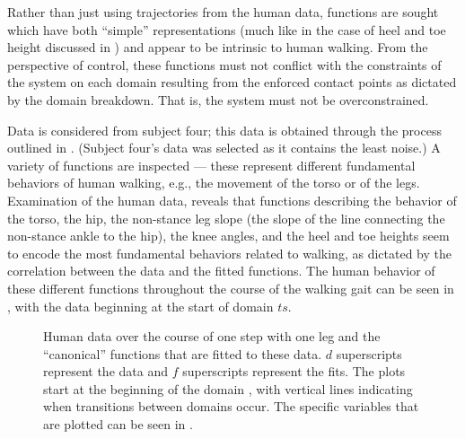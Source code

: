 Rather than just using trajectories from the human data, functions are sought which have both ``simple'' representations (much like in the case of heel and toe height discussed in ) and appear to be intrinsic to human walking. From the perspective of control, these functions must not conflict with the constraints of the system on each domain resulting from the enforced contact points as dictated by the domain breakdown. That is, the system must not be overconstrained.

Data is considered from subject four; this data is obtained through the process outlined in . (Subject four's data was selected as it contains the least noise.) A variety of functions are inspected --- these represent different fundamental behaviors of human walking, e.g., the movement of the torso or of the legs. Examination of the human data, reveals that functions describing the behavior of the torso, the hip, the non-stance leg slope (the slope of the line connecting the non-stance ankle to the hip), the knee angles, and the heel and toe heights seem to encode the most fundamental behaviors related to walking, as dictated by the correlation between the data and the fitted functions. The human behavior of these different functions throughout the course of the walking gait can be seen in , with the data beginning at the start of domain $ts$.

\begin{figure}[t!]
  \centering
  \caption[Human data over the course of one step with one leg]{Human data over the course of one step with one leg and the ``canonical'' functions that are fitted to these data. $d$ superscripts represent the data and $f$ superscripts represent the fits. The plots start at the beginning of the domain {\DA}, with vertical lines indicating when transitions between domains occur. The specific variables that are plotted can be seen in .}
  \label{fig:constraints-fitting}
\end{figure}

